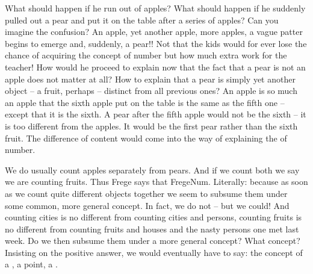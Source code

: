 What should happen if he run out of apples? What should happen if he suddenly
pulled out a pear and put it on the 
table after a series of apples?  Can you imagine the confusion?
An apple, yet another apple, more apples, a vague
patter begins to emerge and, suddenly, a pear!!  Not that the kids
would for ever lose the chance of acquiring the concept of number but
how much extra work for the teacher!  How would he proceed to explain
now that the fact that a pear is not an apple does not matter at all? 
How to explain that a pear is simply yet another object -- a fruit,
perhaps -- distinct from all previous ones?  An apple is so much an
apple that the sixth apple put on the table is the same as the fifth
one -- except that it is the sixth.  A pear after the fifth
apple would not be the sixth -- it is too different from the apples. 
It would be the first pear rather than the sixth fruit.  The
difference of content would come into the way of explaining the  of number.

We do usually count apples separately from pears.  And if we count both we say
we are counting fruits.  Thus Frege says that \citet{number is the extension of
  a concept}{FregeNum}{{}. Literally: } because as soon as we count quite different objects
together we seem to subsume them under some common, more general concept.
%
In fact, we do not -- but we could!  And counting cities is no different from
counting cities and persons, counting fruits is no different from counting
fruits and houses and the nasty persons one met last week.  Do we then subsume
them under a more general concept? What concept? Insisting on the positive
answer, we would eventually have to say: the concept of a ,
a point, a .


